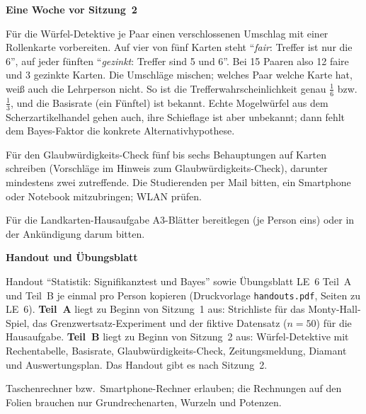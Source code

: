 \begin{vorbereitung}
\textbf{Eine Woche vor Sitzung~2}
\begin{checkliste}
  \item Für die Würfel-Detektive je Paar einen verschlossenen Umschlag
    mit einer Rollenkarte vorbereiten. Auf vier von fünf Karten steht
    \enquote{\emph{fair}: Treffer ist nur die 6}, auf jeder fünften
    \enquote{\emph{gezinkt}: Treffer sind 5 und 6}. Bei 15 Paaren also
    12 faire und 3 gezinkte Karten. Die Umschläge mischen; welches Paar
    welche Karte hat, weiß auch die Lehrperson nicht. So ist die
    Trefferwahrscheinlichkeit genau $\tfrac16$ bzw.\ $\tfrac13$, und die
    Basisrate (ein Fünftel) ist bekannt. Echte Mogelwürfel aus dem
    Scherzartikelhandel gehen auch, ihre Schieflage ist aber unbekannt;
    dann fehlt dem Bayes-Faktor die konkrete Alternativhypothese.
  \item Für den Glaubwürdigkeits-Check fünf bis sechs Behauptungen auf
    Karten schreiben (Vorschläge im Hinweis zum Glaubwürdigkeits-Check),
    darunter mindestens zwei zutreffende. Die Studierenden per Mail
    bitten, ein Smartphone oder Notebook mitzubringen; WLAN prüfen.
  \item Für die Landkarten-Hausaufgabe A3-Blätter bereitlegen (je
    Person eins) oder in der Ankündigung darum bitten.
\end{checkliste}

\textbf{Handout und Übungsblatt}
\begin{checkliste}
  \item Handout \enquote{Statistik: Signifikanztest und Bayes} sowie
    Übungsblatt LE~6 Teil~A und Teil~B je einmal pro Person kopieren
    (Druckvorlage \texttt{handouts.pdf}, Seiten zu LE~6). \textbf{Teil~A}
    liegt zu Beginn von Sitzung~1 aus: Strichliste für das
    Monty-Hall-Spiel, das Grenzwertsatz-Experiment und der fiktive
    Datensatz ($n=50$) für die Hausaufgabe. \textbf{Teil~B} liegt zu
    Beginn von Sitzung~2 aus: Würfel-Detektive mit Rechentabelle,
    Basisrate, Glaubwürdigkeits-Check, Zeitungsmeldung, Diamant und
    Auswertungsplan. Das Handout gibt es nach Sitzung~2.
  \item Taschenrechner bzw.\ Smartphone-Rechner erlauben; die
    Rechnungen auf den Folien brauchen nur Grundrechenarten, Wurzeln und
    Potenzen.
\end{checkliste}


\end{vorbereitung}
